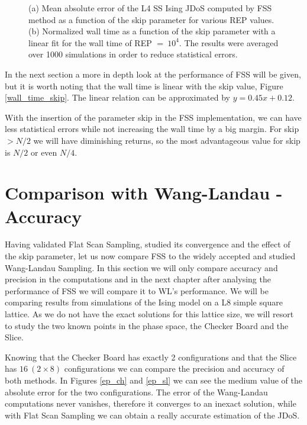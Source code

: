 	\pagebreak

\begin{figure}[h]
	\centering
	\caption{(a) Mean absolute error of the L4 SS Ising JDoS computed by FSS method as a function of the skip parameter for various REP values. (b) Normalized wall time as a function of the skip parameter with a linear fit for the wall time of REP $=\ 10^4$. The results were averaged over 1000 simulations in order to reduce statistical errors.}
\end{figure}

	In the next section a more in depth look at the performance of FSS will be given, but it is worth noting that the wall time is linear with the skip value, Figure \ref{wall_time_skip}. The linear relation can be approximated by $y=0.45x + 0.12$. 
	
	With the insertion of the parameter skip in the FSS implementation, we can have less statistical errors while not increasing the wall time by a big margin. For skip$> N/2$ we will have diminishing returns, so the most advantageous value for skip is $N/2$ or even $N/4$. 

\section{Comparison with Wang-Landau - Accuracy}

	Having validated Flat Scan Sampling, studied its convergence and the effect of the skip parameter, let us now compare FSS to the widely accepted and studied Wang-Landau Sampling. In this section we will only compare accuracy and precision in the computations and in the next chapter after analysing the performance of FSS we will compare it to WL's performance. 
	We will be comparing results from simulations of the Ising model on a L8 simple square lattice. As we do not have the exact solutions for this lattice size, we will resort to study the two known points in the phase space, the Checker Board and the Slice. 
	
	Knowing that the Checker Board has exactly 2 configurations and that the Slice has $16\ (2 \times 8)$ configurations we can compare the precision and accuracy of both methods. In Figures \ref{ep_ch} and \ref{ep_sl} we can see the medium value of the absolute error for the two configurations. The error of the Wang-Landau computations never vanishes, therefore it converges to an inexact solution, while with Flat Scan Sampling we can obtain a really accurate estimation of the JDoS. 
	
